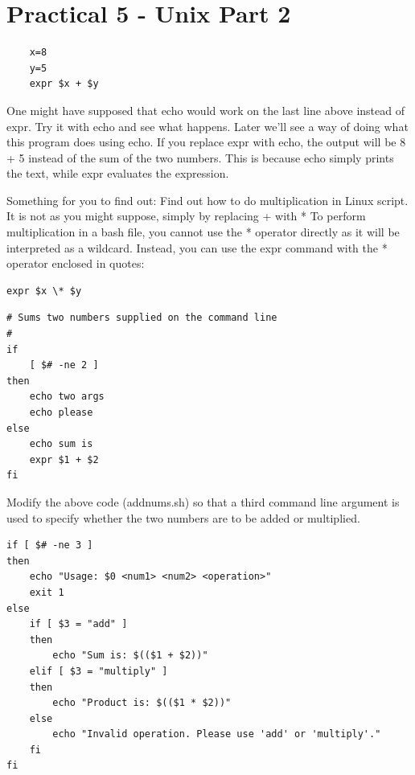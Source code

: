 \documentclass[a4paper]{article}
\begin{document}
\section{Practical 5 -  Unix Part 2}

\begin{verbatim}
    x=8
    y=5
    expr $x + $y
\end{verbatim}
\textcolor{green!50!black}{
One might have supposed that echo would work on the last line above instead of
expr. Try it with echo and see what happens. Later we’ll see a way of doing what this program
does using echo.
}
If you replace expr with echo, the output will be 8 + 5 instead of the sum of the two numbers. This is because echo simply prints the text, while expr evaluates the expression.

\textcolor{green!50!black}{
Something for you to find out: Find out how to do
multiplication in Linux script. It is not as you might suppose,
simply by replacing + with *
}
To perform multiplication in a bash file, you cannot use the * operator directly as it will be interpreted as a wildcard. Instead, you can use the expr command with the * operator enclosed in quotes:
\begin{verbatim}
expr $x \* $y
\end{verbatim}
\noindent
\vspace{1em}

\noindent
\begin{verbatim}
# Sums two numbers supplied on the command line
#
if
    [ $# -ne 2 ]
then
    echo two args
    echo please
else
    echo sum is
    expr $1 + $2
fi
\end{verbatim}
\textcolor{green!50!black}{
Modify the above code (addnums.sh) so that a third command line argument is used to
specify whether the two numbers are to be added or multiplied. 
}

\begin{verbatim}
if [ $# -ne 3 ]
then
    echo "Usage: $0 <num1> <num2> <operation>"
    exit 1
else 
    if [ $3 = "add" ]
    then
        echo "Sum is: $(($1 + $2))"
    elif [ $3 = "multiply" ]
    then
        echo "Product is: $(($1 * $2))"
    else
        echo "Invalid operation. Please use 'add' or 'multiply'."
    fi
fi
\end{verbatim}
\vspace{1em}
\end{document}
